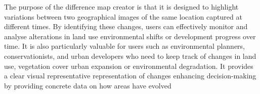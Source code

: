 The purpose of the difference map creator is that it is designed to highlight variations between two geographical images of the same location captured at different times.
By identifying these changes, users can effectively monitor and analyse alterations in land use environmental shifts or development progress over time.
It is also particularly valuable for users such as environmental planners, conservationists, and urban developers who need to keep track of changes in land use, vegetation cover urban expansion or environmental degradation.
It provides a clear visual representative representation of changes enhancing decision-making by providing concrete data on how areas have evolved






